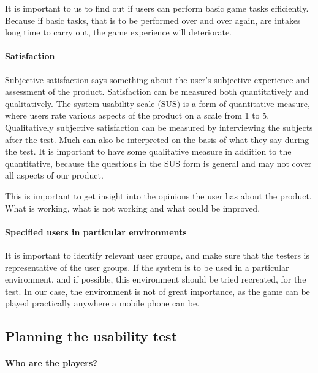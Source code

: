 		It is important to us to find out if users can perform basic game tasks efficiently. Because if basic tasks, that is to be performed over and over again, are intakes long time to carry out, the game experience will deteriorate.

	\paragraph{Satisfaction}

		Subjective satisfaction says something about the user's subjective experience and assessment of the product. Satisfaction can be measured both quantitatively and qualitatively. The system usability scale (SUS) is a form of quantitative measure, where users rate various aspects of the product on a scale from 1 to 5. Qualitatively subjective satisfaction can be measured by interviewing the subjects after the test. Much can also be interpreted on the basis of what they say during the test. It is important to have some qualitative measure in addition to the quantitative, because the questions in the SUS form is general and may not cover all aspects of our product.

		This is important to get insight into the opinions the user has about the product. What is working, what is not working and what could be improved.

	\paragraph{Specified users in particular environments}

		It is important to identify relevant user groups, and make sure that the testers is representative of the user groups. If the system is to be used in a particular environment, and if possible, this environment should be tried recreated, for the test. In our case, the environment is not of great importance, as the game can be played practically anywhere a mobile phone can be.

\subsection{Planning the usability test}

	\paragraph{Who are the players?}\mbox{}\\

